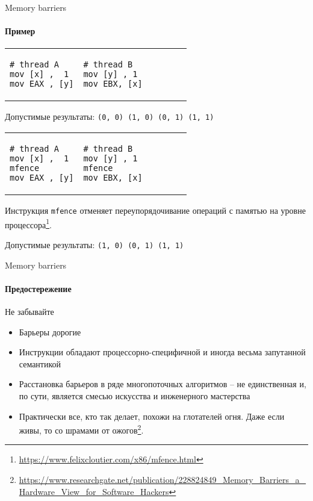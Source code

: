 \begin{frame}[fragile]{Memory barriers}
\framesubtitle{Пример}

\vspace{-0.5cm}

\begin{tabular}{p{} p{}}
\begin{verbatim}
# thread A
mov [x] ,  1
mov EAX , [y]
\end{verbatim}

& 

\begin{verbatim}
# thread B          
mov [y] , 1
mov EBX, [x]
\end{verbatim}
\end{tabular}

Допустимые результаты: 
\pause 
\texttt{(0, 0) (1, 0) (0, 1) (1, 1)}

\pause
\vspace{-0.25cm}

\begin{tabular}{p{} p{}}
\begin{verbatim}
# thread A
mov [x] ,  1
mfence      
mov EAX , [y]
\end{verbatim}

& 

\begin{verbatim}
# thread B          
mov [y] , 1
mfence
mov EBX, [x]
\end{verbatim}
\end{tabular}

\pause
Инструкция \texttt{mfence} отменяет переупорядочивание операций с памятью на уровне процессора\footnote<4->{\tiny\url{https://www.felixcloutier.com/x86/mfence.html}}.

\pause

Допустимые результаты: \pause \texttt{(1, 0) (0, 1) (1, 1)}
\end{frame}


\begin{frame}{Memory barriers}
\framesubtitle{Предостережение}

Не забывайте
\begin{itemize}
  \pause
  \item Барьеры дорогие

  \pause
  \item Инструкции обладают процессорно-специфичной и иногда весьма запутанной семантикой

  \pause
  \item Расстановка барьеров в ряде многопоточных алгоритмов -- не единственная и, по сути, является смесью искусства и инженерного мастерства

  \pause
  \item Практически все, кто так делает, похожи на глотателей огня. Даже если живы, то со шрамами от ожогов\footnote<5->{\tiny\url{https://www.researchgate.net/publication/228824849_Memory_Barriers_a_Hardware_View_for_Software_Hackers}}.
\end{itemize}
\end{frame}


